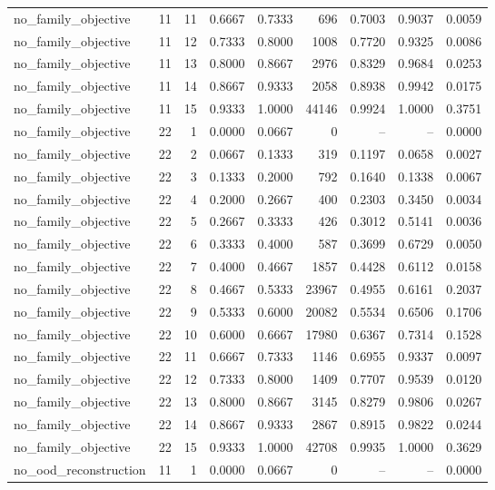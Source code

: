 \begin{tabular}{lrrrrrrrr}
no\_family\_objective & 11 & 11 & 0.6667 & 0.7333 & 696 & 0.7003 & 0.9037 & 0.0059 \\
no\_family\_objective & 11 & 12 & 0.7333 & 0.8000 & 1008 & 0.7720 & 0.9325 & 0.0086 \\
no\_family\_objective & 11 & 13 & 0.8000 & 0.8667 & 2976 & 0.8329 & 0.9684 & 0.0253 \\
no\_family\_objective & 11 & 14 & 0.8667 & 0.9333 & 2058 & 0.8938 & 0.9942 & 0.0175 \\
no\_family\_objective & 11 & 15 & 0.9333 & 1.0000 & 44146 & 0.9924 & 1.0000 & 0.3751 \\
no\_family\_objective & 22 & 1 & 0.0000 & 0.0667 & 0 & -- & -- & 0.0000 \\
no\_family\_objective & 22 & 2 & 0.0667 & 0.1333 & 319 & 0.1197 & 0.0658 & 0.0027 \\
no\_family\_objective & 22 & 3 & 0.1333 & 0.2000 & 792 & 0.1640 & 0.1338 & 0.0067 \\
no\_family\_objective & 22 & 4 & 0.2000 & 0.2667 & 400 & 0.2303 & 0.3450 & 0.0034 \\
no\_family\_objective & 22 & 5 & 0.2667 & 0.3333 & 426 & 0.3012 & 0.5141 & 0.0036 \\
no\_family\_objective & 22 & 6 & 0.3333 & 0.4000 & 587 & 0.3699 & 0.6729 & 0.0050 \\
no\_family\_objective & 22 & 7 & 0.4000 & 0.4667 & 1857 & 0.4428 & 0.6112 & 0.0158 \\
no\_family\_objective & 22 & 8 & 0.4667 & 0.5333 & 23967 & 0.4955 & 0.6161 & 0.2037 \\
no\_family\_objective & 22 & 9 & 0.5333 & 0.6000 & 20082 & 0.5534 & 0.6506 & 0.1706 \\
no\_family\_objective & 22 & 10 & 0.6000 & 0.6667 & 17980 & 0.6367 & 0.7314 & 0.1528 \\
no\_family\_objective & 22 & 11 & 0.6667 & 0.7333 & 1146 & 0.6955 & 0.9337 & 0.0097 \\
no\_family\_objective & 22 & 12 & 0.7333 & 0.8000 & 1409 & 0.7707 & 0.9539 & 0.0120 \\
no\_family\_objective & 22 & 13 & 0.8000 & 0.8667 & 3145 & 0.8279 & 0.9806 & 0.0267 \\
no\_family\_objective & 22 & 14 & 0.8667 & 0.9333 & 2867 & 0.8915 & 0.9822 & 0.0244 \\
no\_family\_objective & 22 & 15 & 0.9333 & 1.0000 & 42708 & 0.9935 & 1.0000 & 0.3629 \\
no\_ood\_reconstruction & 11 & 1 & 0.0000 & 0.0667 & 0 & -- & -- & 0.0000 \\

\end{tabular}
